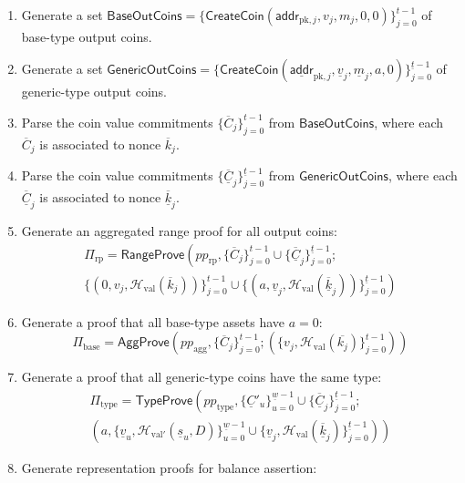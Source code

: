 \documentclass{article}
\newcommand{\func}[1]{\mathsf{#1}}
\newcommand{\addr}{\func{addr}}
\newcommand{\hash}{\mathcal{H}}
\begin{document}
\begin{enumerate}
\begin{enumerate}
    \end{enumerate}
    \item Generate a set $\func{BaseOutCoins} = \{\func{CreateCoin}(\addr_{\text{pk},j}, v_j, m_j, 0, 0)\}_{j=0}^{t-1}$ of base-type output coins.
    \item Generate a set $\func{GenericOutCoins} = \{\func{CreateCoin}(\underline{\addr}_{\text{pk},j}, \underline{v}_j, \underline{m}_j, a, 0)\}_{j=0}^{\underline{t}-1}$ of generic-type output coins.
    \item Parse the coin value commitments $\{\overline{C}_j\}_{j=0}^{t-1}$ from $\func{BaseOutCoins}$, where each $\overline{C}_j$ is associated to nonce $\overline{k}_j$.
    \item Parse the coin value commitments $\{\underline{\overline{C}}_j\}_{j=0}^{\underline{t}-1}$ from $\func{GenericOutCoins}$, where each $\underline{\overline{C}}_j$ is associated to nonce $\underline{\overline{k}}_j$.
    \item Generate an aggregated range proof for all output coins:
    \begin{multline*}
        \Pi_{\text{rp}} = \func{RangeProve}\left( pp_{\text{rp}}, \{\overline{C}_j\}_{j=0}^{t-1} \cup \{\underline{\overline{C}}_j\}_{j=0}^{\underline{t}-1} ; \right. \\
        \left. \{(0, v_j, \hash_{\text{val}}(\overline{k}_j))\}_{j=0}^{t-1} \cup \{(a, \underline{v}_j, \hash_{\text{val}}(\underline{\overline{k}}_j))\}_{j=0}^{\underline{t}-1} \right)
    \end{multline*}
    \item Generate a proof that all base-type assets have $a = 0$: $$\Pi_{\text{base}} = \func{AggProve}\left( pp_{\text{agg}}, \{\overline{C}_j\}_{j=0}^{t-1} ; (\{v_j, \hash_{\text{val}}(\overline{k_j})\}_{j=0}^{t-1}) \right)$$
    \item Generate a proof that all generic-type coins have the same type:
    \begin{multline*}
        \Pi_{\text{type}} = \func{TypeProve}\left( pp_{\text{type}}, \{\underline{C}'_u\}_{u=0}^{\underline{w}-1} \cup \{\underline{\overline{C}}_j\}_{j=0}^{\underline{t}-1} ; \right. \\
        \left. \left(a, \{\underline{v}_u, \hash_{\text{val}'}(\underline{s}_u,D)\}_{u=0}^{\underline{w}-1} \cup \{\underline{v}_j, \hash_{\text{val}}(\underline{\overline{k}}_j)\}_{j=0}^{\underline{t}-1}\right) \right)
    \end{multline*}
    \item Generate representation proofs for balance assertion:

\end{enumerate}
\end{document}
